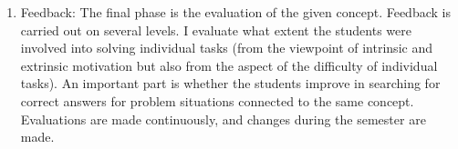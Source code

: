 \documentclass[11pt, a4paper]{awesome-cv}
\begin{document}
\begin{cvletter}
\begin{enumerate}
	\item Feedback: The final phase is the evaluation of the given concept. Feedback is carried out on several levels. I evaluate what extent the students were involved into solving individual tasks (from the viewpoint of intrinsic and extrinsic motivation but also from the aspect of the difficulty of individual tasks). An important part is whether the students improve in searching for correct answers for problem situations connected to the same concept.  Evaluations are made continuously, and changes during the semester are made. 
	
\end{enumerate}


\end{cvletter}
\end{document}
